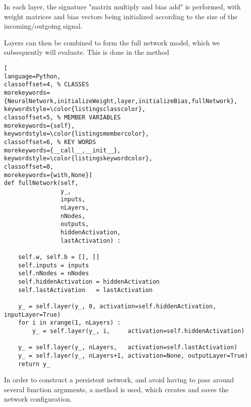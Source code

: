 \documentclass[../../master.tex]{subfiles}
\begin{document}
In each layer, the signature "matrix multiply and bias add" is performed, with weight matrices and bias vectors being initialized according to the size of the incoming/outgoing signal. 

Layers can then be combined to form the full network model, which we subsequently will evaluate. This is done in the  method
\begin{lstlisting}[
language=Python,
classoffset=4, % CLASSES
morekeywords={NeuralNetwork,initializeWeight,layer,initializeBias,fullNetwork},
keywordstyle=\color{listingsclasscolor},
classoffset=5, % MEMBER VARIABLES
morekeywords={self},
keywordstyle=\color{listingsmembercolor},
classoffset=6, % KEY WORDS
morekeywords={__call__,__init__},
keywordstyle=\color{listingskeywordcolor},
classoffset=0,
morekeywords={with,None}]
def fullNetwork(self,
                y_,
                inputs,
                nLayers,
                nNodes,
                outputs,
                hiddenActivation,
                lastActivation) :

    self.w, self.b = [], []
    self.inputs = inputs
    self.nNodes = nNodes
    self.hiddenActivation = hiddenActivation
    self.lastActivation   = lastActivation

    y_ = self.layer(y_, 0, activation=self.hiddenActivation, inputLayer=True)
    for i in xrange(1, nLayers) :
        y_ = self.layer(y_, i,     activation=self.hiddenActivation)
      
    y_ = self.layer(y_, nLayers,   activation=self.lastActivation)
    y_ = self.layer(y_, nLayers+1, activation=None, outputLayer=True)
    return y_
\end{lstlisting}
In order to construct a persistent network, and avoid having to pass around several function arguments, a  method is used, which creates and saves the network configuration. 
\end{document}
